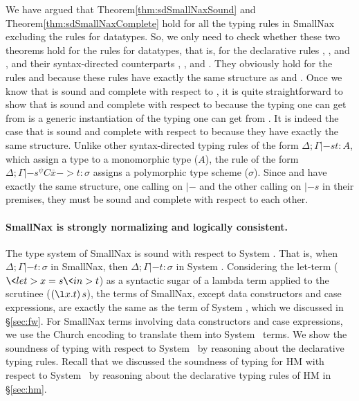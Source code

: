 We have argued that Theorem\;\ref{thm:sdSmallNaxSound} and
Theorem\;\ref{thm:sdSmallNaxComplete} hold for all the typing rules
in SmallNax excluding the rules for datatypes. So, we only need to check
whether these two theorems hold for the rules for datatypes, that is,
for the declarative rules , , and ,
and their syntax-directed counterparts , ,
and . They obviously hold for the rules  and
 because these rules have exactly the same structure as 
 and . Once we know that  is
sound and complete with respect to , it is quite
straightforward to show that  is sound and complete
with respect to  because the typing one can get
from  is a generic instantiation of the typing
one can get from . It is indeed the case that
 is sound and complete with respect to 
because they have exactly the same structure. Unlike other syntax-directed
typing rules of the form $\Delta;\Gamma |-s t : A$, which assign
a type to a monomorphic type ($A$), the rule 
of the form $\Delta;\Gamma |-s^\psi C\overline{x} -> t : \sigma$
assigns a polymorphic type scheme ($\sigma$). Since  and
 have exactly the same structure, one calling on $|-$
and the other calling on $|-s$ in their premises, they must be sound
and complete with respect to each other.

\paragraph{SmallNax is strongly normalizing and logically consistent.}
The type system of SmallNax is sound with respect to System \Fw.
That is, when $\Delta;\Gamma |- t:\sigma$ in SmallNax, then 
$\Delta;\Gamma |- t:\sigma$ in System \Fw.
Considering the let-term ($\<let> x=s \<in> t$) as a syntactic sugar of
a lambda term applied to the scrutinee ($(\l x.t)\,s$), the terms of SmallNax,
except data constructors and case expressions, are exactly the same as
the term of System \Fw, which we discussed in \S\ref{sec:fw}.
For SmallNax terms involving data constructors and case expressions, we use
the Church encoding to translate them into System \Fw\ terms.
We show the soundness of typing with respect to System \Fw\ by reasoning about
the declarative typing rules. Recall that we discussed
the soundness of typing for HM with respect to System \F\ by reasoning about
the declarative typing rules of HM in \S\ref{sec:hm}.

